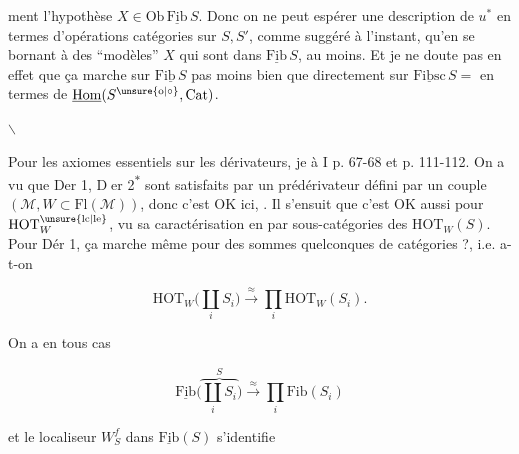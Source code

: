 
ment l'hypothèse $X\in\mathrm{Ob}\,\underline{\mathrm{Fib}}\,S$. Donc on ne peut espérer  une description de $u^*$  en termes d'opérations   catégories sur $S,S'$,  comme suggéré à l'instant, qu'en se bornant à des ``modèles'' $X$ qui sont dans $\underline{\mathrm{Fib}}\,S$,  au moins. Et je ne doute pas en effet que ça marche sur $\underline{\mathrm{Fib}\,S}$ pas moins bien que directement sur $\underline{\mathrm{Fibsc}}\,S=$ en termes de $\underline{\mathrm{Hom}}(S^{\unsure{\mathrm o|\circ}},\mathrm{Cat})$.

\centerline{\(\backslash\)}

Pour les axiomes essentiels sur les dérivateurs, je  à I p. 67-68 et p. 111-112. On a vu que Der 1, \textcircled{\scriptsize Der 2}\textsuperscript{$*$} sont satisfaits par un prédérivateur défini par un couple $(\mathcal M,W\subset\mathrm{Fl}(\mathcal M))$, donc c'est OK ici, . Il s'ensuit que c'est OK aussi pour $\mathrm{HOT}^{\unsure{\mathrm{lc}|\mathrm{le}}}_W$,  vu sa caractérisation  en  par sous-catégories des $\mathrm{HOT}_W(S)$. Pour Dér 1, ça marche  même pour des sommes quelconques de catégories ?, i.e. a-t-on


\[
\mathrm{HOT}_W\bigl(\coprod_i S_i\bigr)\xrightarrow{\approx}\prod_i\mathrm{HOT}_W(S_i).
\]

On a en tous cas

\[
\underline{\mathrm{Fib}}\bigl(\overbrace{\coprod_i S_i}^{S}\bigr)
 \xrightarrow{\approx}\prod_i\mathrm{Fib}(S_i)
\]

et le localiseur $W^f_S$  dans $\underline{\mathrm{Fib}}(S)$ s'identifie
